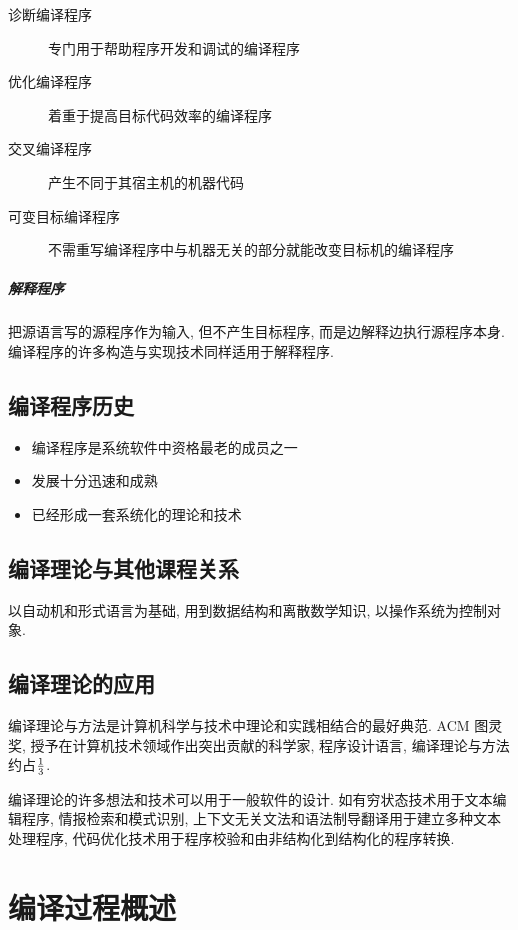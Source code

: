         \begin{description}
            \item[诊断编译程序] 专门用于帮助程序开发和调试的编译程序
            \item[优化编译程序] 着重于提高目标代码效率的编译程序
            \item[交叉编译程序] 产生不同于其宿主机的机器代码
            \item[可变目标编译程序] 不需重写编译程序中与机器无关的部分就能改变目标机的编译程序
        \end{description}

    \subparagraph{解释程序}    把源语言写的源程序作为输入, 但不产生目标程序, 而是边解释边执行源程序本身. 编译程序的许多构造与实现技术同样适用于解释程序.

    \subsection{编译程序历史}

        \begin{itemize}
            \item 编译程序是系统软件中资格最老的成员之一
            \item 发展十分迅速和成熟
            \item 已经形成一套系统化的理论和技术
        \end{itemize}

    \subsection{编译理论与其他课程关系}

        以自动机和形式语言为基础, 用到数据结构和离散数学知识, 以操作系统为控制对象.

    \subsection{编译理论的应用}

        编译理论与方法是计算机科学与技术中理论和实践相结合的最好典范. ACM 图灵奖, 授予在计算机技术领域作出突出贡献的科学家, 程序设计语言, 编译理论与方法约占$1\over 3$.

        编译理论的许多想法和技术可以用于一般软件的设计. 如有穷状态技术用于文本编辑程序, 情报检索和模式识别, 上下文无关文法和语法制导翻译用于建立多种文本处理程序, 代码优化技术用于程序校验和由非结构化到结构化的程序转换.

\section{编译过程概述}


